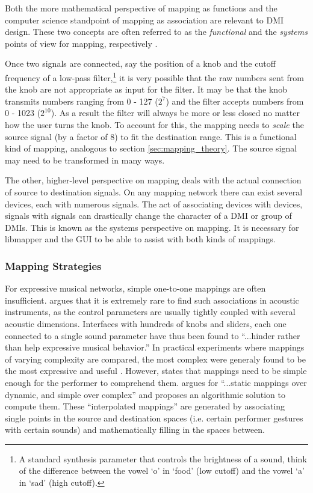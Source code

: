 Both the more mathematical perspective of mapping as functions and the computer science standpoint of mapping as association are relevant to DMI design. These two concepts are often referred to as the \emph{functional} and the \emph{systems} points of view for mapping, respectively \cite{two_types_of_mapping}. 

Once two signals are connected, say the position of a knob and the cutoff frequency of a low-pass filter,\footnote{A standard synthesis parameter that controls the brightness of a sound, think of the difference between the vowel `o' in `food' (low cutoff) and the vowel `a' in `sad' (high cutoff).} it is very possible that the raw numbers sent from the knob are not appropriate as input for the filter. It may be that the knob transmits numbers ranging from 0 - 127 ($2^7$) and the filter accepts numbers from 0 - 1023 ($2^{10}$). As a result the filter will always be more or less closed no matter how the user turns the knob. To account for this, the mapping needs to \emph{scale} the source signal (by a factor of 8) to fit the destination range. This is a functional kind of mapping, analogous to section \ref{sec:mapping_theory}. The source signal may need to be transformed in many ways. 

The other, higher-level perspective on mapping deals with the actual connection of source to destination signals. On any mapping network there can exist several devices, each with numerous signals. The act of associating devices with devices, signals with signals can drastically change the character of a DMI or group of DMIs. This is known as the systems perspective on mapping. It is necessary for libmapper and the GUI to be able to assist with both kinds of mappings.

	\subsubsection{Mapping Strategies}

For expressive musical networks, simple one-to-one mappings are often insufficient.   argues that it is extremely rare to find such associations in acoustic instruments, as the control parameters are usually tightly coupled with several acoustic dimensions. Interfaces with hundreds of knobs and sliders, each one connected to a single sound parameter have thus been found to ``...hinder rather than help expressive musical behavior.''  In practical experiments where mappings of varying complexity are compared, the most complex were generaly found to be the most expressive and useful \cite{mapping_complexity_experiments}. However,  states that mappings need to be simple enough for the performer to comprehend them.  argues for ``...static mappings over dynamic, and simple over complex'' and proposes an algorithmic solution to compute them. These ``interpolated mappings'' are generated by associating single points in the source and destination spaces (i.e. certain performer gestures with certain sounds) and mathematically filling in the spaces between.

